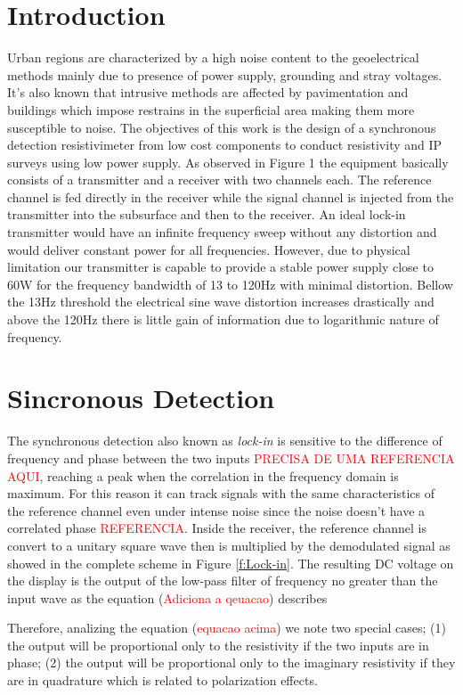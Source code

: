 \documentclass{vie16}
\newcommand{\att}[1]{\textcolor{red}{#1}}
\begin{document}
\section{Introduction}
Urban regions are characterized by a high noise content to the
geoelectrical methods mainly due to presence of power supply,
grounding and stray voltages. It's also known that intrusive methods
are affected by pavimentation and buildings which impose restrains in
the superficial area making them more susceptible to noise. The
objectives of this work is the design of a synchronous detection
resistivimeter from low cost components to conduct resistivity and IP
surveys using low power supply.  As observed in Figure 1 the equipment
basically consists of a transmitter and a receiver with two channels
each. The reference channel is fed directly in the receiver while the
signal channel is injected from the transmitter into the subsurface
and then to the receiver. An ideal lock-in transmitter would have an
infinite frequency sweep without any distortion and would deliver
constant power for all frequencies. However, due to physical
limitation our transmitter is capable to provide a stable power supply
close to 60W for the frequency bandwidth of 13 to 120Hz with minimal
distortion.  Bellow the 13Hz threshold the electrical sine wave
distortion increases drastically and above the 120Hz there is little
gain of information due to logarithmic nature of frequency.

\section{Sincronous Detection}
The synchronous detection also known as \textit{lock-in} is sensitive
to the difference of frequency and phase between the two inputs
\att{PRECISA DE UMA REFERENCIA AQUI}, reaching a peak when the
correlation in the frequency domain is maximum. For this reason it can
track signals with the same characteristics of the reference channel
even under intense noise since the noise doesn't have a correlated
phase \att{REFERENCIA}. Inside the receiver, the reference channel is
convert to a unitary square wave then is multiplied by the demodulated
signal as showed in the complete scheme in Figure \ref{f:Lock-in}. The
resulting DC voltage on the display is the output of the low-pass
filter of frequency no greater than the input wave as the equation
(\att{Adiciona a qeuacao}) describes 
  
Therefore, analizing the equation (\att{equacao acima}) we note two
special cases; (1) the output will be proportional only to the
resistivity if the two inputs are in phase; (2) the output will be
proportional only to the imaginary resistivity if they are in
quadrature which is related to polarization effects.
\end{document}
